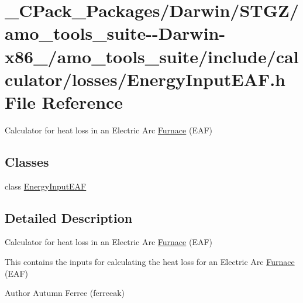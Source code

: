 \hypertarget{___c_pack___packages_2_darwin_2_s_t_g_z_2amo__tools__suite--_darwin-x86__64_2amo__tools__suite_25a35b9aa0eebdbaae0658026a04be93f}{}\section{\+\_\+\+C\+Pack\+\_\+\+Packages/\+Darwin/\+S\+T\+G\+Z/amo\+\_\+tools\+\_\+suite-\/-\/\+Darwin-\/x86\+\_/amo\+\_\+tools\+\_\+suite/include/calculator/losses/\+Energy\+Input\+E\+AF.h File Reference}
\label{___c_pack___packages_2_darwin_2_s_t_g_z_2amo__tools__suite--_darwin-x86__64_2amo__tools__suite_25a35b9aa0eebdbaae0658026a04be93f}


Calculator for heat loss in an Electric Arc \hyperlink{class_furnace}{Furnace} (E\+AF)  


\subsection*{Classes}
\begin{DoxyCompactItemize}
\item 
class \hyperlink{class_energy_input_e_a_f}{Energy\+Input\+E\+AF}
\end{DoxyCompactItemize}


\subsection{Detailed Description}
Calculator for heat loss in an Electric Arc \hyperlink{class_furnace}{Furnace} (E\+AF) 

This contains the inputs for calculating the heat loss for an Electric Arc \hyperlink{class_furnace}{Furnace} (E\+AF)

\begin{DoxyAuthor}{Author}
Autumn Ferree (ferreeak) 
\end{DoxyAuthor}
